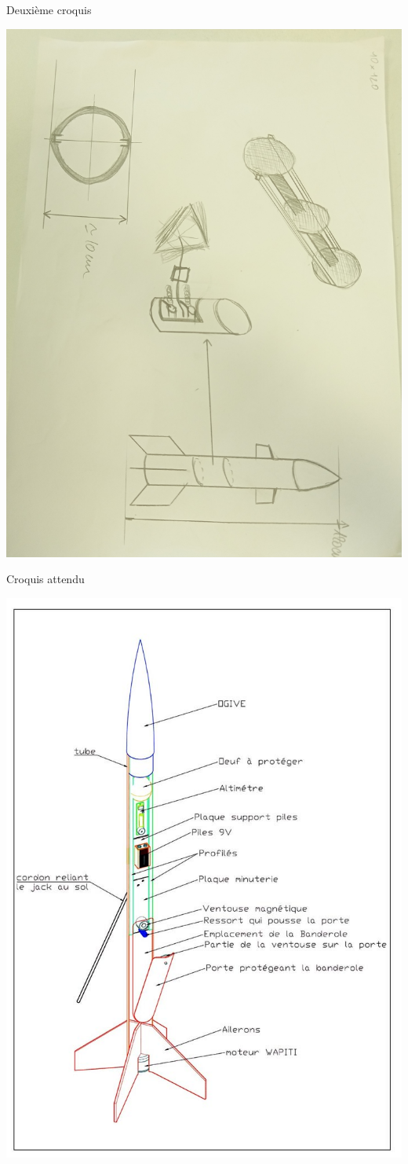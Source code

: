 \documentclass{beamer}
\begin{document}
	
	\begin{frame}{Deuxième croquis}	
	
		\begin{center}	
	
			\includegraphics[width=0.7\linewidth,angle=90]{pics/croquis_2.png}
		\end{center}
	\end{frame}


	\begin{frame}{Croquis attendu}

		\begin{center}

			\includegraphics[width=0.5\linewidth]{pics/Minif_RC_Perspective_V4_light_web.jpg}
		\end{center}
	\end{frame}
\end{document}
